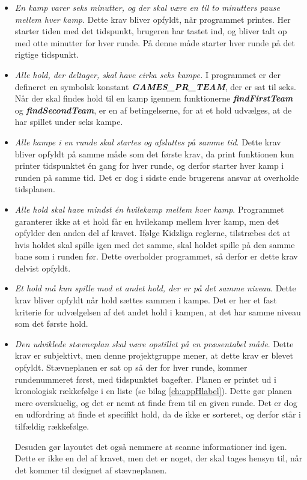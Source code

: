 \begin{itemize}
    \item \textit{En kamp varer seks minutter, og der skal være en til to minutters pause mellem hver kamp}. Dette krav bliver opfyldt, når programmet printes. Her starter tiden med det tidspunkt, brugeren har tastet ind, og bliver talt op med otte minutter for hver runde. På denne måde starter hver runde på det rigtige tidspunkt.
    \item \textit{Alle hold, der deltager, skal have cirka seks kampe.} I programmet er der defineret en symbolsk konstant \textbf{\textit{GAMES\_PR\_TEAM}}, der er sat til seks. Når der skal findes hold til en kamp igennem funktionerne \textbf{\textit{findFirstTeam}} og \textbf{\textit{findSecondTeam}}, er en af betingelserne, for at et hold udvælges, at de har spillet under seks kampe.
    \item \textit{Alle kampe i en runde skal startes og afsluttes på samme tid}. Dette krav bliver opfyldt på samme måde som det første krav, da print funktionen kun printer tidspunktet én gang for hver runde, og derfor starter hver kamp i runden på samme tid. Det er dog i sidste ende brugerens ansvar at overholde tidsplanen. 
    \item \textit{Alle hold skal have mindst én hvilekamp mellem hver kamp}. Programmet garanterer ikke at et hold får en hvilekamp mellem hver kamp, men det opfylder den anden del af kravet. Ifølge Kidzliga reglerne, tilstræbes det at hvis holdet skal spille igen med det samme, skal holdet spille på den samme bane som i runden før. Dette overholder programmet, så derfor er dette krav delvist opfyldt.
    \item \textit{Et hold må kun spille mod et andet hold, der er på det samme niveau}. Dette krav bliver opfyldt når hold sættes sammen i kampe. Det er her et fast kriterie for udvælgelsen af det andet hold i kampen, at det har samme niveau som det første hold. 
    \item \textit{Den udviklede stævneplan skal være opstillet på en præsentabel måde}. Dette krav er subjektivt, men denne projektgruppe mener, at dette krav er blevet opfyldt. Stævneplanen er sat op så der for hver runde, kommer rundenummeret først, med tidspunktet bagefter. Planen er printet ud i kronologisk rækkefølge i en liste (se bilag \ref{ch:appHlabel}). Dette gør planen mere overskuelig, og det er nemt at finde frem til en given runde. Det er dog en udfordring at finde et specifikt hold, da de ikke er sorteret, og derfor står i tilfældig rækkefølge.
    \par
    Desuden gør layoutet det også nemmere at scanne informationer ind igen. Dette er ikke en del af kravet, men det er noget, der skal tages hensyn til, når det kommer til designet af stævneplanen.
\end{itemize}


